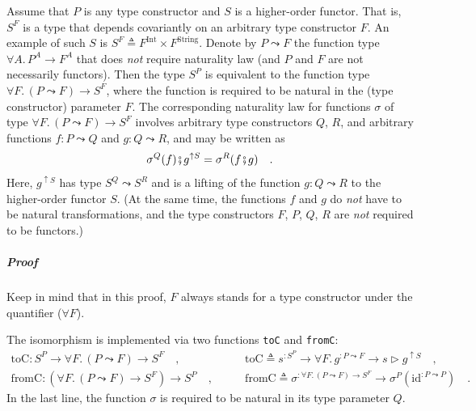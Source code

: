 Assume that $P$ is any type constructor and $S$ is a higher-order
functor.
That is, $S^{F}$ is a type that depends covariantly on an arbitrary
type constructor $F$. An example of such $S$ is $S^{F}\triangleq F^{\text{Int}}\times F^{\text{String}}$.
Denote by $P\leadsto F$ the function type $\forall A.\,P^{A}\rightarrow F^{A}$
that does \emph{not} require naturality law (and $P$ and $F$ are
not necessarily functors). Then the type $S^{P}$ is equivalent to
the function type $\forall F.\,(P\leadsto F)\rightarrow S^{F}$, where
the function is required to be natural in the (type constructor) parameter
$F$. The corresponding naturality law for functions $\sigma$ of
type $\forall F.\,(P\leadsto F)\rightarrow S^{F}$ involves arbitrary
type constructors $Q$, $R$, and arbitrary functions $f:P\leadsto Q$
and $g:Q\leadsto R$, and may be written as
\begin{equation}
\sigma^{Q}(f)\bef g^{\uparrow S}=\sigma^{R}(f\bef g)\quad.\label{eq:assumed-naturality-of-argument-sigma}
\end{equation}
Here, $g^{\uparrow S}$ has type $S^{Q}\leadsto S^{R}$ and is a lifting
of the function $g:Q\leadsto R$ to the higher-order functor $S$.
(At the same time, the functions $f$ and $g$ do \emph{not} have
to be natural transformations, and the type constructors $F$, $P$,
$Q$, $R$ are \emph{not} required to be functors.)

\subparagraph{Proof}

Keep in mind that in this proof, $F$ always stands for a type constructor
under the quantifier ($\forall F$).

The isomorphism is implemented via two functions \lstinline!toC!
and \lstinline!fromC!:
\begin{align*}
\text{toC}:S^{P}\rightarrow\forall F.\,(P\leadsto F)\rightarrow S^{F}\quad, & \quad\quad\text{toC}\triangleq s^{:S^{P}}\rightarrow\forall F.\,g^{:P\leadsto F}\rightarrow s\triangleright g^{\uparrow S}\quad,\\
\text{fromC}:(\forall F.\,(P\leadsto F)\rightarrow S^{F})\rightarrow S^{P}\quad, & \quad\quad\text{fromC}\triangleq\sigma^{:\forall F.\,(P\leadsto F)\rightarrow S^{F}}\rightarrow\sigma^{P}(\text{id}^{:P\leadsto P})\quad.
\end{align*}
In the last line, the function $\sigma$ is required to be natural
in its type parameter $Q$.

